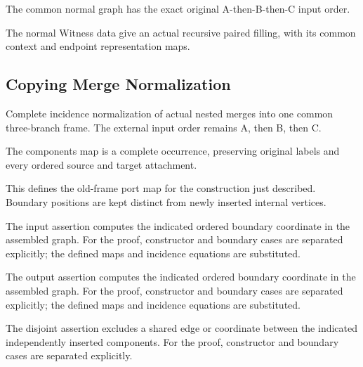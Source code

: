 The common normal graph has the exact original A-then-B-then-C input order.
\par{}

The normal Witness data give an actual recursive paired filling, with its common context and endpoint representation maps.
\par{}

\subsection{Copying Merge Normalization}
Complete incidence normalization of actual nested merges into one common three-branch frame. The external input order remains A, then B, then C.

The components map is a complete occurrence, preserving original labels and every ordered source and target attachment.
\par{}

This defines the old-frame port map for the construction just described. Boundary positions are kept distinct from newly inserted internal vertices.
\par{}

The input assertion computes the indicated ordered boundary coordinate in the assembled graph.
For the proof, constructor and boundary cases are separated explicitly; the defined maps and incidence equations are substituted.
\par{}

The output assertion computes the indicated ordered boundary coordinate in the assembled graph.
For the proof, constructor and boundary cases are separated explicitly; the defined maps and incidence equations are substituted.
\par{}

The disjoint assertion excludes a shared edge or coordinate between the indicated independently inserted components.
For the proof, constructor and boundary cases are separated explicitly.
\par{}

